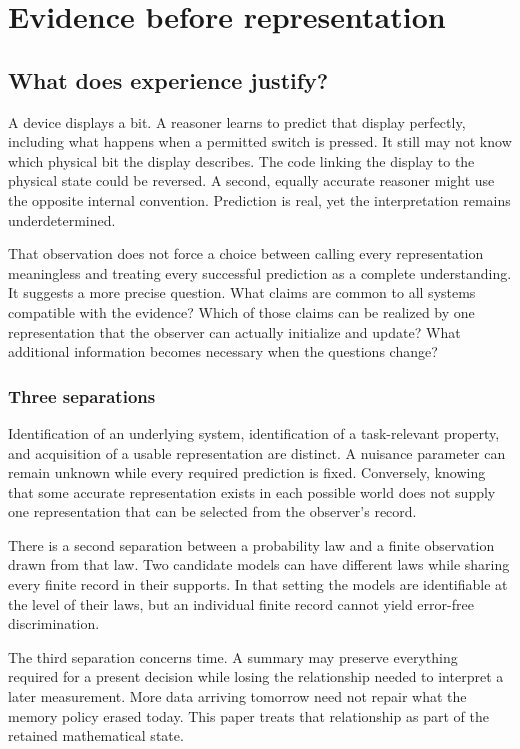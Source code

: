 
\chapter{Evidence before representation}\label{GA:book:chapter-25}

\section{What does experience justify?}\label{GA:sec:introduction}
A device displays a bit. A reasoner learns to predict that display perfectly, including what happens when a permitted switch is pressed. It still may not know which physical bit the display describes. The code linking the display to the physical state could be reversed. A second, equally accurate reasoner might use the opposite internal convention. Prediction is real, yet the interpretation remains underdetermined.

That observation does not force a choice between calling every representation meaningless and treating every successful prediction as a complete understanding. It suggests a more precise question. What claims are common to all systems compatible with the evidence? Which of those claims can be realized by one representation that the observer can actually initialize and update? What additional information becomes necessary when the questions change?

\subsection{Three separations}
Identification of an underlying system, identification of a task-relevant property, and acquisition of a usable representation are distinct. A nuisance parameter can remain unknown while every required prediction is fixed. Conversely, knowing that some accurate representation exists in each possible world does not supply one representation that can be selected from the observer's record.

There is a second separation between a probability law and a finite observation drawn from that law. Two candidate models can have different laws while sharing every finite record in their supports. In that setting the models are identifiable at the level of their laws, but an individual finite record cannot yield error-free discrimination.

The third separation concerns time. A summary may preserve everything required for a present decision while losing the relationship needed to interpret a later measurement. More data arriving tomorrow need not repair what the memory policy erased today. This paper treats that relationship as part of the retained mathematical state.


